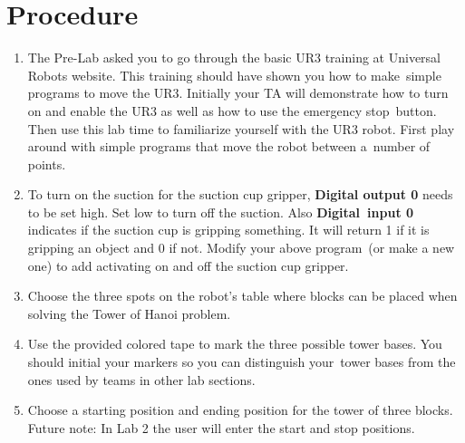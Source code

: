 \section{Procedure}
\begin{enumerate}
\item The Pre-Lab asked you to go through the basic UR3 training at Universal Robots website.  This training should have shown you how to make\ 
simple programs to move the UR3.  Initially your TA will demonstrate how to turn on and enable the UR3 as well as how to use the emergency stop\ 
button.  Then use this lab time to familiarize yourself with the UR3 robot.  First play around with simple programs that move the robot between a\ 
number of points.  
\item To turn on the suction for the suction cup gripper, \textbf{Digital output 0} needs to be set high.  Set low to turn off the suction.  Also \textbf{Digital\ 
input 0} indicates if the suction cup is gripping something.  It will return 1 if it is gripping an object and 0 if not.  Modify your above program\ 
(or make a new one) to add activating on and off the suction cup gripper.  
\item Choose the three spots on the robot's table where blocks can be placed when solving the Tower of Hanoi problem.
\item Use the provided colored tape to mark the three possible tower bases.  You should initial your markers so you can distinguish your\
tower bases from the ones used by teams in other lab sections.
\item Choose a starting position and ending position for the tower of three blocks.  Future note: In Lab 2 the user will enter the start and stop positions.


\end{enumerate}
